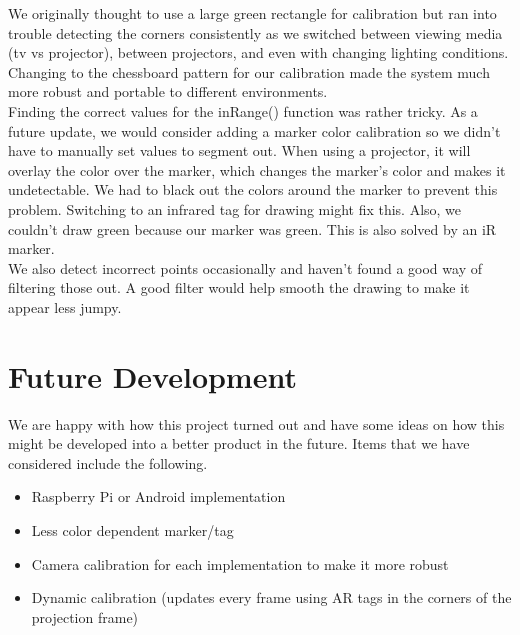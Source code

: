 \documentclass[letterpaper,10pt,oneside,onecolumn, titlepage]{article}
\begin{document}
We originally thought to use a large green rectangle for calibration but ran into trouble detecting the corners consistently as we switched between viewing media (tv vs projector), between projectors, and even with changing lighting conditions.  Changing to the chessboard pattern for our calibration made the system much more robust and portable to different environments.\\
Finding the correct values for the inRange() function was rather tricky.  As a future update, we would consider adding a marker color calibration so we didn't have to manually set values to segment out.  When using a projector, it will overlay the color over the marker, which changes the marker's color and makes it undetectable.  We had to black out the colors around the marker to prevent this problem.  Switching to an infrared tag for drawing might fix this.  Also, we couldn't draw green because our marker was green.  This is also solved by an iR marker.\\
We also detect incorrect points occasionally and haven't found a good way of filtering those out.  A good filter would help smooth the drawing to make it appear less jumpy.

\section{Future Development}
We are happy with how this project turned out and have some ideas on how this might be developed into a better product in the future.  Items that we have considered include the following.

\begin{itemize}
    \item Raspberry Pi or Android implementation
    \item Less color dependent marker/tag
    \item Camera calibration for each implementation to make it more robust
    \item Dynamic calibration (updates every frame using AR tags in the corners of the projection frame)
\end{itemize}
\end{document}
